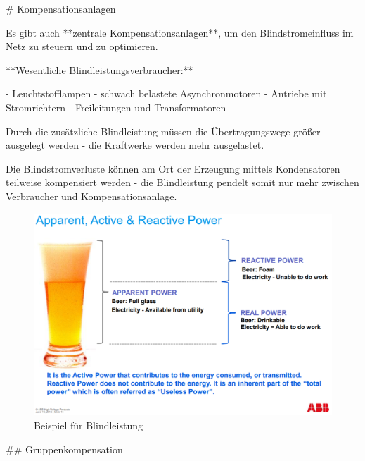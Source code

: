 \begin{markdown}
# Kompensationsanlagen


Es gibt auch **zentrale Kompensationsanlagen**, um den Blindstromeinfluss im Netz zu steuern und zu optimieren.

**Wesentliche Blindleistungsverbraucher:**

- Leuchtstofflampen
- schwach belastete Asynchronmotoren
- Antriebe mit Stromrichtern
- Freileitungen und Transformatoren

Durch die zusätzliche Blindleistung müssen die Übertragungswege größer ausgelegt werden - die Kraftwerke werden mehr ausgelastet.

Die Blindstromverluste können am Ort der Erzeugung mittels Kondensatoren teilweise kompensiert werden - die Blindleistung pendelt somit nur mehr zwischen Verbraucher und Kompensationsanlage.

\vspace{2em}

\begin{figure}[H]
    \centering
    \includegraphics[width=\linewidth]{./images/11-Kompensationsanlagen/Reactive-Power-Compensation-ABB.png}
    \caption[Beispiel für Blindleistung]{Beispiel für Blindleistung}
\end{figure}

\newpage

## Gruppenkompensation



\end{markdown}
